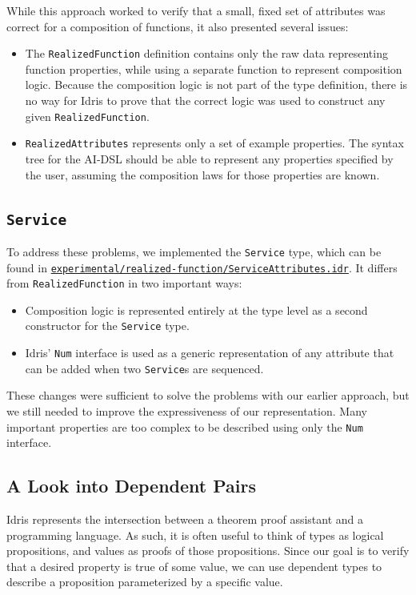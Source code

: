\documentclass[]{report}
\begin{document}
While this approach worked to verify that a small, fixed set of attributes was
correct for a composition of functions, it also presented several issues:

\begin{itemize}
  \item
        The \texttt{RealizedFunction} definition contains only the raw data
        representing function properties, while using a separate function to
        represent composition logic.  Because the composition logic is not
        part of the type definition, there is no way for Idris to prove that the
        correct logic was used to construct any given \texttt{RealizedFunction}.


  \item \texttt{RealizedAttributes} represents only a set of example properties.
        The syntax tree for the AI-DSL should be able to represent any
        properties specified by the user, assuming the composition laws for
        those properties are known.


\end{itemize}

\subsection{\texttt{Service}}
To address these problems, we implemented the \texttt{Service} type,
which can be found in
\href{https://github.com/singnet/ai-dsl/blob/master/experimental/realized-function/ServiceAttributes.idr}{\texttt{experimental/realized-function/ServiceAttributes.idr}}.
It differs from \texttt{RealizedFunction} in two important ways:
\begin{itemize}
  \item Composition logic is represented entirely at the type level as a second
        constructor for the \texttt{Service} type.

  \item Idris' \texttt{Num} interface is used as a generic representation of any
        attribute that can be added when two \texttt{Service}s are sequenced.

\end{itemize}

These changes were sufficient to solve the problems with our earlier approach,
but we still needed to improve the expressiveness of our representation.  Many
important properties are too complex to be described using only the \texttt{Num}
interface.

\subsection{A Look into Dependent Pairs}
\label{sec:dependent_pairs}
Idris represents the intersection between a theorem proof assistant and a
programming language.  As such, it is often useful to think of types as
logical propositions, and values as proofs of those propositions.  Since our
goal is to verify that a desired property is true of some value, we can use
dependent types to describe a proposition parameterized by a specific value.
\end{document}
